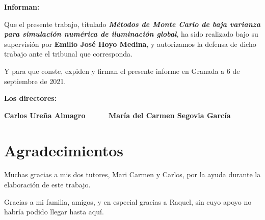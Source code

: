 \textbf{Informan:}

\vspace{0.5cm}

Que el presente trabajo, titulado \textit{\textbf{Métodos de Monte Carlo de baja varianza para simulación numérica de iluminación global}},
ha sido realizado bajo su supervisión por \textbf{Emilio José Hoyo Medina}, y autorizamos la defensa de dicho trabajo ante el tribunal
que corresponda.

\vspace{0.5cm}

Y para que conste, expiden y firman el presente informe en Granada a 6 de septiembre de 2021.

\vspace{1cm}

\textbf{Los directores:}

\vspace{5cm}

\noindent \textbf{Carlos Ureña Almagro \ \ \ \ \ María del Carmen Segovia García}

\chapter*{Agradecimientos}
\thispagestyle{empty}

       \vspace{1cm}


Muchas gracias a mis dos tutores, Mari Carmen y Carlos, por la ayuda durante la elaboración de este trabajo.

Gracias a mi familia, amigos, y en especial gracias a Raquel, sin cuyo apoyo no habría podido llegar hasta aquí.

